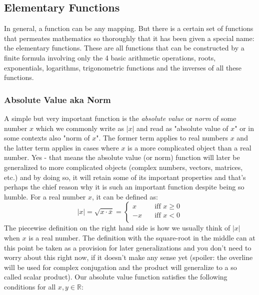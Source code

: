 \subsection{Elementary Functions}
In general, a function can be any mapping. But there is a certain set of functions that permeates mathematics so thoroughly that it has been given a special name: the elementary functions. These are all functions that can be constructed by a finite formula involving only the 4 basic arithmetic operations, roots, exponentials, logarithms, trigonometric functions and the inverses of all these functions.



\subsubsection{Absolute Value aka Norm}
A simple but very important function is the \emph{absolute value} or \emph{norm} of some number $x$ which we commonly write as $|x|$ and read as "absolute value of $x$" or in some contexts also "norm of $x$". The former term applies to real numbers $x$ and the latter term applies in cases where $x$ is a more complicated object than a real number. Yes - that means the absolute value (or norm) function will later be generalized to more complicated objects (complex numbers, vectors, matrices, etc.) and by doing so, it will retain some of its important properties and that's perhaps the chief reason why it is such an important function despite being so humble. For a real number $x$, it can be defined as:
\begin{equation}
 |x| = \sqrt{x \cdot \overline{x}} = 
\begin{cases} 
  x \quad & \text{iff } x \geq 0 \\
 -x \quad & \text{iff } x   <  0 \\
\end{cases} 
\end{equation}
The piecewise definition on the right hand side is how we usually think of $|x|$ when $x$ is a real number. The definition with the square-root in the middle can at this point be taken as a provision for later generalizations and you don't need to worry about this right now, if it doesn't make any sense yet (spoiler: the overline will be used for complex conjugation and the product will generalize to a so called scalar product). Our absolute value function satisfies the following conditions for all $x,y \in \mathbb{R}$:

